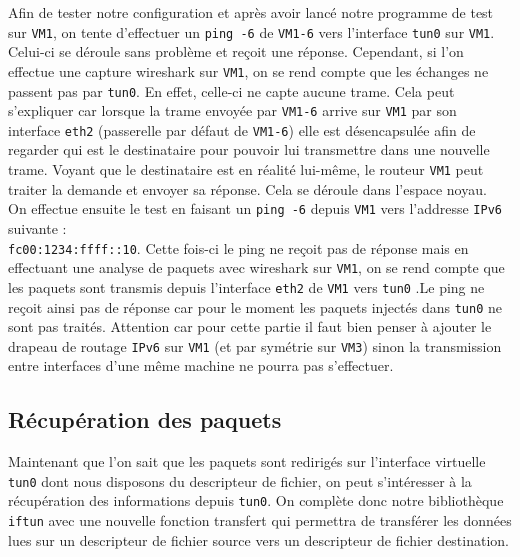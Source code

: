 \documentclass[a4paper, 12pt]{article}
\begin{document}
    Afin de tester notre configuration et après avoir lancé notre programme de 
    test sur \verb+VM1+, on tente d'effectuer un \verb+ping -6+ de \verb+VM1-6+
    vers l'interface \verb+tun0+ sur \verb+VM1+. Celui-ci se déroule sans 
    problème et reçoit une réponse. Cependant, si l'on effectue une capture 
    wireshark sur \verb+VM1+, on se rend compte que les échanges ne passent pas 
    par \verb+tun0+. En effet, celle-ci ne capte aucune trame. Cela peut 
    s'expliquer car lorsque la trame envoyée par \verb+VM1-6+ arrive sur 
    \verb+VM1+ par son interface \verb+eth2+ (passerelle par défaut de 
    \verb+VM1-6+) elle est désencapsulée afin de regarder qui est le 
    destinataire pour pouvoir lui transmettre dans une nouvelle trame. Voyant
    que le destinataire est en réalité lui-même, le routeur \verb+VM1+ peut 
    traiter la demande et envoyer sa réponse. Cela se déroule dans l'espace 
    noyau. \\

    On effectue ensuite le test en faisant un \verb+ping -6+ depuis \verb+VM1+
    vers l'addresse \verb+IPv6+ suivante : \\ \verb+fc00:1234:ffff::10+. Cette 
    fois-ci le ping ne reçoit pas de réponse mais en effectuant une analyse de 
    paquets avec wireshark sur \verb+VM1+, on se rend compte que les paquets 
    sont transmis depuis l'interface \verb+eth2+ de \verb+VM1+ vers \verb+tun0+
    .Le ping ne reçoit ainsi pas de réponse car pour le moment les paquets 
    injectés dans \verb+tun0+ ne sont pas traités. Attention car pour cette 
    partie il faut bien penser à ajouter le drapeau de routage \verb+IPv6+ sur 
    \verb+VM1+ (et par symétrie sur \verb+VM3+) sinon la transmission entre 
    interfaces d'une même machine ne pourra pas s'effectuer. 

    \subsection{Récupération des paquets}
    Maintenant que l'on sait que les paquets sont redirigés sur l'interface
    virtuelle \verb+tun0+ dont nous disposons du descripteur de fichier, on 
    peut s'intéresser à la récupération des informations depuis \verb+tun0+. 
    On complète donc notre bibliothèque \verb+iftun+ avec une nouvelle fonction
    transfert qui permettra de transférer les données lues sur un descripteur 
    de fichier source vers un descripteur de fichier destination. \\
\end{document}
